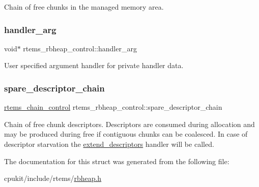 Chain of free chunks in the managed memory area. \mbox{\label{structrtems__rbheap__control_ad72b6257df7118611d4d4a0a5379f883}} 
\subsubsection{\texorpdfstring{handler\_arg}{handler\_arg}}
{\footnotesize\ttfamily void$\ast$ rtems\+\_\+rbheap\+\_\+control\+::handler\+\_\+arg}

User specified argument handler for private handler data. \mbox{\label{structrtems__rbheap__control_a00fc7e68788659d7be52f9c467acfbf3}} 
\subsubsection{\texorpdfstring{spare\_descriptor\_chain}{spare\_descriptor\_chain}}
{\footnotesize\ttfamily \mbox{\hyperlink{unionChain__Control}{rtems\+\_\+chain\+\_\+control}} rtems\+\_\+rbheap\+\_\+control\+::spare\+\_\+descriptor\+\_\+chain}

Chain of free chunk descriptors. Descriptors are consumed during allocation and may be produced during free if contiguous chunks can be coalesced. In case of descriptor starvation the \mbox{\hyperlink{structrtems__rbheap__control_a85883a3e5d1acabbbf80dc953dfb4148}{extend\+\_\+descriptors}} handler will be called. 

The documentation for this struct was generated from the following file\+:\begin{DoxyCompactItemize}
\item 
cpukit/include/rtems/\mbox{\hyperlink{rbheap_8h}{rbheap.\+h}}\end{DoxyCompactItemize}
